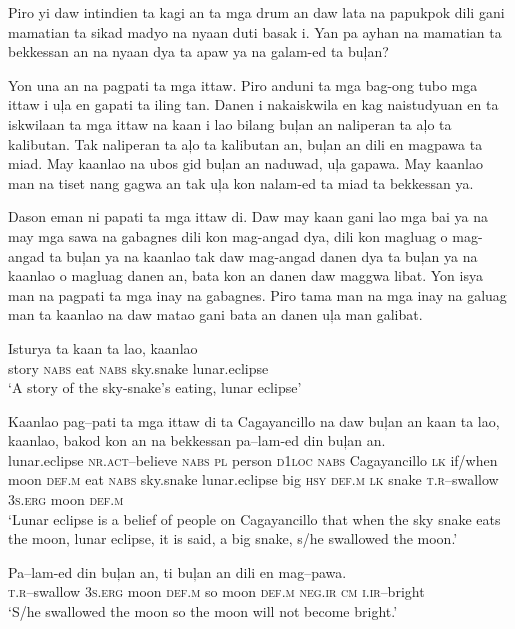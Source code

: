 Piro yi daw intindien ta kagi an ta mga drum an daw lata na papukpok dili gani mamatian ta sikad madyo na nyaan duti basak i. Yan pa ayhan na mamatian ta bekkessan an na nyaan dya ta apaw ya na galam-ed ta bu\c{l}an?

Yon una an na pagpati ta mga ittaw. Piro anduni ta mga bag-ong tubo mga ittaw i u\c{l}a en gapati ta iling tan. Danen i nakaiskwila en kag naistudyuan en ta iskwilaan ta mga ittaw na kaan i lao bilang bu\c{l}an an naliperan ta a\c{l}o ta kalibutan. Tak naliperan ta a\c{l}o ta kalibutan an, bu\c{l}an an dili en magpawa ta miad. May kaanlao na ubos gid bu\c{l}an an naduwad, u\c{l}a gapawa. May kaanlao man na tiset nang gagwa an tak u\c{l}a kon nalam-ed ta miad ta bekkessan ya.

Dason eman ni papati ta mga ittaw di. Daw may kaan gani lao mga bai ya na may mga sawa na gabagnes dili kon mag-angad dya, dili kon magluag o mag-angad ta bu\c{l}an ya na kaanlao tak daw mag-angad danen dya ta bu\c{l}an ya na kaanlao o magluag danen an, bata kon an danen daw maggwa libat. Yon isya man na pagpati ta mga inay na gabagnes. Piro tama man na mga inay na galuag man ta kaanlao na daw matao gani bata an danen u\c{l}a man galibat.  

\ea
\gll Isturya  ta  kaan  ta  lao,  kaanlao \\
story  \textsc{nabs}  eat  \textsc{nabs}  sky.snake  lunar.eclipse \\
\glt `A story of the sky-snake's eating, lunar eclipse'
\z

\ea
\gll Kaanlao  pag--pati  ta  mga  ittaw  di  ta  Cagayancillo   na  daw  bu\c{l}an  an  kaan  ta  lao,  kaanlao,  bakod   kon  an  na  bekkessan  pa--lam-ed  din  bu\c{l}an  an. \\
lunar.eclipse  \textsc{nr.act}--believe  \textsc{nabs}  \textsc{pl}  person  \textsc{d1loc}  \textsc{nabs}  Cagayancillo
\textsc{lk}  if/when  moon  \textsc{def.m}  eat  \textsc{nabs}  sky.snake  lunar.eclipse  big
\textsc{hsy}  \textsc{def.m}  \textsc{lk}  snake  \textsc{t.r}--swallow  3\textsc{s.erg}  moon  \textsc{def.m} \\
\glt `Lunar eclipse is a belief of people on Cagayancillo that when the sky snake eats the moon, lunar eclipse, it is said, a big snake, s/he swallowed the moon.’
\z

\ea
\gll Pa--lam-ed  din  bu\c{l}an  an,  ti\footnotemark{}  bu\c{l}an  an  dili  en   mag--pawa. \\
\textsc{t.r}--swallow  3\textsc{s.erg}  moon  \textsc{def.m}  so  moon  \textsc{def.m}  \textsc{neg.ir}  \textsc{cm}
\textsc{i.ir}--bright \\
\glt ‘S/he swallowed the moon so the moon will not become bright.’
\z

